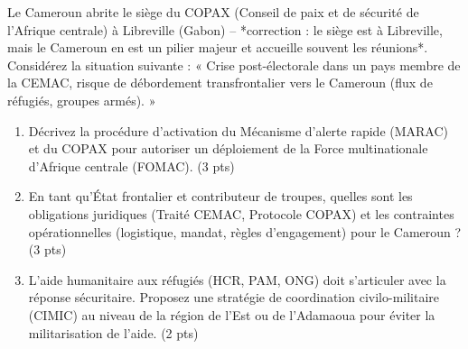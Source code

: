 \documentclass[11pt]{article}
\begin{document}
\begin{exercice}
Le Cameroun abrite le siège du COPAX (Conseil de paix et de sécurité de l'Afrique centrale) à Libreville (Gabon) -- *correction : le siège est à Libreville, mais le Cameroun en est un pilier majeur et accueille souvent les réunions*. Considérez la situation suivante : « Crise post-électorale dans un pays membre de la CEMAC, risque de débordement transfrontalier vers le Cameroun (flux de réfugiés, groupes armés). »

\begin{enumerate}
\item Décrivez la procédure d'activation du Mécanisme d'alerte rapide (MARAC) et du COPAX pour autoriser un déploiement de la Force multinationale d'Afrique centrale (FOMAC). (3 pts)
\item En tant qu'État frontalier et contributeur de troupes, quelles sont les obligations juridiques (Traité CEMAC, Protocole COPAX) et les contraintes opérationnelles (logistique, mandat, règles d'engagement) pour le Cameroun ? (3 pts)
\item L'aide humanitaire aux réfugiés (HCR, PAM, ONG) doit s'articuler avec la réponse sécuritaire. Proposez une stratégie de coordination civilo-militaire (CIMIC) au niveau de la région de l'Est ou de l'Adamaoua pour éviter la militarisation de l'aide. (2 pts)
\end{enumerate}
\end{exercice}
\end{document}
